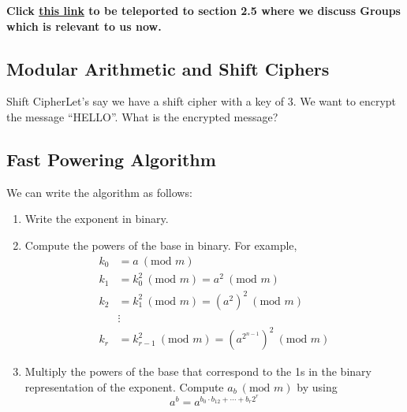 
\textbf{Click \hyperlink{2.5 group}{this link} to be teleported to section 2.5 where we discuss Groups which is relevant to us now.} \\




\subsection{Modular Arithmetic and Shift Ciphers}

\begin{example}
    {Shift Cipher}Let's say we have a shift cipher with a key of 3. We want to encrypt the message ``HELLO''. What is the encrypted message?
\end{example}


\subsection{Fast Powering Algorithm}

We can write the algorithm as follows: \begin{enumerate}[label=\arabic*.]
    \item Write the exponent in binary.
    \item Compute the powers of the base in binary. For example,
          \begin{align*}
              k_0 & = a \ (\text{mod } m)                                             \\
              k_1 & = k_0^2 \ (\text{mod } m) = a^2 \ (\text{mod } m)                 \\
              k_2 & = k_1^2 \ (\text{mod } m) = (a^2)^{2} \ (\text{mod } m)           \\
                  & \vdots                                                            \\
              k_r & = k_{r-1}^2 \ (\text{mod } m) = (a^{2^{n-1}})^2 \ (\text{mod } m)
          \end{align*}
    \item Multiply the powers of the base that correspond to the 1s in the binary representation of the exponent.
          Compute \(a_b \ (\text{mod } m)\) by using \[a^b = a^{b_0 \cdot b_{12} + \cdots + b_r2^r}\]
\end{enumerate}

